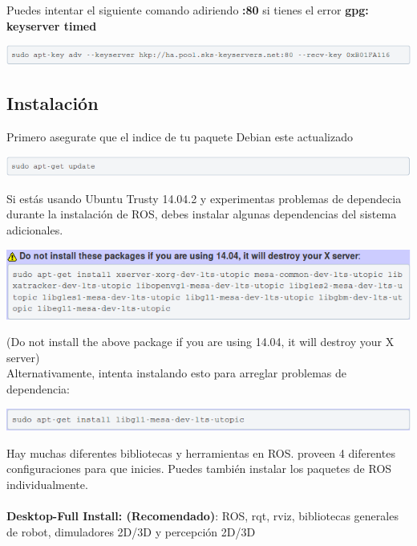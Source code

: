 \documentclass[a4paper]{book}
\begin{document}
Puedes intentar el siguiente comando adiriendo \textbf{:80} si tienes el error \textbf{gpg: keyserver timed}

\begin{center}
\includegraphics[width=1\textwidth]{Figures/Software/Install_ROS/Paso_3.png}
\end{center}

\subsection{Instalación}
Primero asegurate que el indice de tu paquete Debian este actualizado

\begin{center}
\includegraphics[width=1\textwidth]{Figures/Software/Install_ROS/Paso_4.png}
\end{center}

Si estás usando Ubuntu Trusty 14.04.2 y experimentas problemas de dependecia durante la instalación de ROS, debes 
instalar algunas dependencias del sistema adicionales.

\begin{center}
\includegraphics[width=1\textwidth]{Figures/Software/Install_ROS/Paso_5.png}
\end{center}

(Do not install the above package if you are using 14.04, it will destroy your X server)\\
Alternativamente, intenta instalando esto para arreglar problemas de\\ dependencia: 

\begin{center}
\includegraphics[width=1\textwidth]{Figures/Software/Install_ROS/Paso_6.png}
\end{center}

Hay muchas diferentes bibliotecas y herramientas en ROS. proveen 4 diferentes configuraciones para que inicies. Puedes 
también instalar los paquetes de ROS individualmente.\\
\\
\textbf{Desktop-Full Install: (Recomendado)}: ROS, rqt, rviz, bibliotecas generales de robot, dimuladores 2D/3D y 
percepción 2D/3D\\
\\
\end{document}
